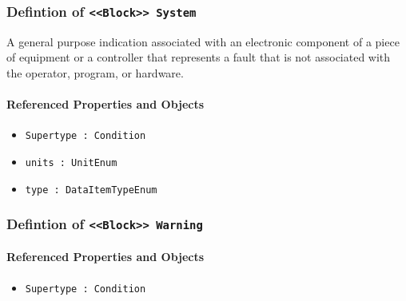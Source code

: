 \subsubsection{Defintion of \texttt{<<Block>> System}}
  \label{type:System}

\FloatBarrier

A general purpose indication associated with an electronic component of a piece of equipment or a controller that represents a fault that is not associated with the operator, program, or hardware.

\FloatBarrier
\paragraph{Referenced Properties and Objects}

\begin{itemize}
\item \texttt{Supertype : Condition}

\item \texttt{units : UnitEnum}

\item \texttt{type : DataItemTypeEnum}

\end{itemize}
\FloatBarrier
\subsubsection{Defintion of \texttt{<<Block>> Warning}}
  \label{type:Warning}

\FloatBarrier



\FloatBarrier
\paragraph{Referenced Properties and Objects}

\begin{itemize}
\item \texttt{Supertype : Condition}

\end{itemize}
\FloatBarrier
